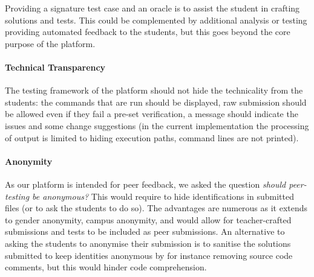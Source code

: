 \documentclass[sigplan,10pt,review]{acmart}\settopmatter{printfolios=true}
\begin{document}
Providing a signature test case and an oracle is to assist the student
in crafting solutions and tests. This could be complemented by
additional analysis or testing providing automated feedback to the
students, but this goes beyond the core purpose of the platform.

\paragraph{Technical Transparency}

The testing framework of the platform should not hide the technicality
from the students: the commands that are run should be displayed, raw submission
should be allowed even if they fail a pre-set verification, a message
should indicate the issues and some change suggestions (in the current
implementation the processing of output is limited to hiding execution
paths, command lines are not printed).



\paragraph{Anonymity}

As our platform is intended for peer feedback, we asked the question
\emph{should peer-testing be anonymous?} This would require to hide
identifications in submitted files (or to ask the students to do
so). The advantages are numerous as it extends to gender anonymity,
campus anonymity, and would allow for teacher-crafted submissions and
tests to be included as peer submissions.  An alternative to asking
the students to anonymise their submission is to sanitise the
solutions submitted to keep identities anonymous by for instance
removing source code comments, but this would hinder code comprehension.
\end{document}
